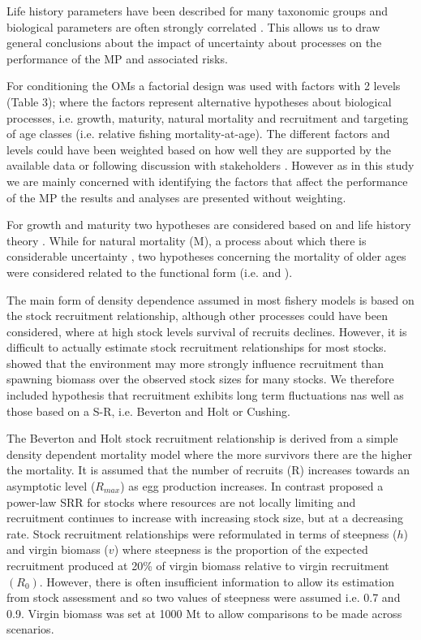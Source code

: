 \documentclass[%
nonumbib,      %
%
]{nrc1}                          %
\begin{document}
Life history parameters have been described for many taxonomic groups and biological parameters are often strongly correlated \cite[e.g.][]{blueweiss1978relationships,gislason2010does}. This allows us to draw general conclusions about the impact of uncertainty about processes on the performance of the MP and associated risks. 

For conditioning the OMs a factorial design was used with factors with 2 levels (Table 3); where the factors represent alternative hypotheses about biological processes, i.e. growth,  maturity, natural mortality and recruitment and targeting of age classes (i.e. relative fishing mortality-at-age). The different factors and levels could have been weighted based on how well they are supported by the available data or following discussion with stakeholders \citep{leach2014elicit}. However as in this study we are mainly concerned with identifying the factors that affect the performance of the MP the results and analyses are presented without weighting.
 
For growth and maturity two hypotheses are considered based on \citep{santiago2005integrated,santiago2004dinamica} and life history theory \citep{gislason2010does}. While for natural mortality (M), a process about which there is considerable uncertainty \citep{hamel2014method}, two hypotheses concerning the mortality of older ages were considered related to the functional form (i.e.  \citep{lorenzen2002density} and \citep{chen1989age}). 

The main form of density dependence assumed in most fishery models is based on the stock recruitment relationship, although other processes \cite[e.g. M,][]{powers2014age} could have been considered, where at high stock levels survival of recruits declines. However, it is difficult to actually estimate stock recruitment relationships for most stocks. \cite{szuwalski2014examining} showed that the environment may more strongly influence recruitment than spawning biomass over the observed stock sizes for many stocks. We therefore included hypothesis that recruitment exhibits long term fluctuations \citep[i.e. red noise][]{ravier2001longterm} nas well as those based on a S-R, i.e. Beverton and Holt or Cushing. 

The Beverton and Holt stock recruitment relationship \citep{beverton1993dynamics} is derived from a simple density dependent mortality model where the more survivors there are the higher the mortality. It is assumed that the number of recruits (R) increases towards an asymptotic level ($R_{max}$) as egg production increases. In contrast \citep{cushing1973dependence} proposed a power-law SRR for stocks where resources are not locally limiting and recruitment continues to increase with increasing stock size, but at a decreasing rate. Stock recruitment relationships were reformulated in terms of steepness ($h$) and virgin biomass ($v$)  where steepness is the proportion of the expected recruitment produced at 20\% of virgin biomass relative to virgin recruitment  $(R_0)$. However, there is often insufficient information to allow its estimation from stock assessment\citep{issf2011steep} and so two values of steepness were assumed i.e. 0.7 and 0.9. Virgin biomass was set at 1000 Mt to allow comparisons to be made across scenarios.
 
\end{document}
